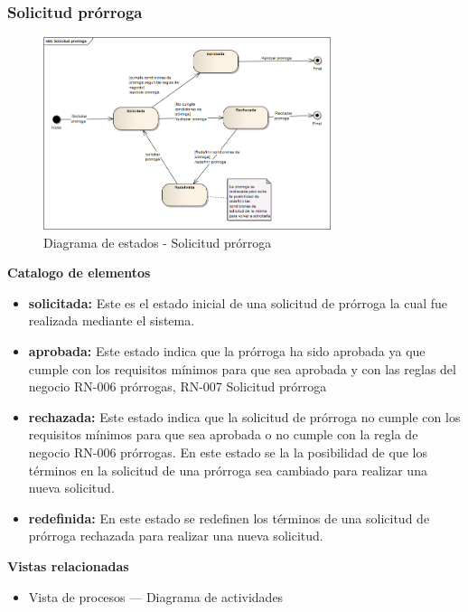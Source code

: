 \documentclass[12pt,oneside,letterpaper]{report}
\begin{document}
\subsubsection{Solicitud prórroga}

\begin{figure}[h!]
  \centering
    \includegraphics[width=0.75\textwidth]{./img/img20.png}
  \caption{Diagrama de estados - Solicitud prórroga}
\end{figure}

\textbf{Catalogo de elementos}

\begin{itemize}
 \item \textbf{solicitada:} Este es el estado inicial de una solicitud de prórroga la cual fue realizada mediante el sistema.
 \item \textbf{aprobada:} Este estado indica que la prórroga ha sido aprobada ya que cumple con los requisitos mínimos para que sea aprobada y con las reglas del negocio RN-006 prórrogas, RN-007 Solicitud  prórroga
 \item \textbf{rechazada:} Este estado indica que la solicitud de prórroga no cumple con los requisitos mínimos para que sea aprobada o no cumple con la regla de negocio RN-006 prórrogas. En este estado se la la posibilidad de que los términos en la solicitud de una prórroga sea cambiado para realizar una nueva solicitud.
 \item \textbf{redefinida:} En este estado se redefinen los términos de una solicitud de prórroga rechazada para realizar una nueva solicitud.
\end{itemize}


\textbf{Vistas relacionadas}
\begin{itemize}
 \item Vista de procesos --- Diagrama de actividades
\end{itemize}
\end{document}
